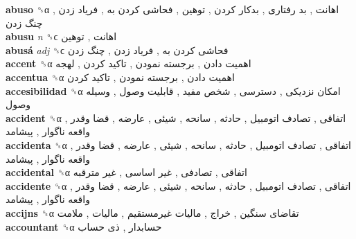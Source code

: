 \textbf{abuso} ␝α   اهانت ,  بد رفتاری ,  بدکار کردن ,  توهین ,  فحاشی کردن به ,  فریاد زدن ,  چنگ زدن   \\
\textbf{abusu} \emph{n}  ␝ϲ   اهانت ,  توهین   \\
\textbf{abusá} \emph{adj}  ␝ϲ   فحاشی کردن به ,  فریاد زدن ,  چنگ زدن   \\
\textbf{accent} ␝α   اهمیت دادن ,  برجسته نمودن ,  تاکید کردن ,  لهجه   \\
\textbf{accentua} ␝α   اهمیت دادن ,  برجسته نمودن ,  تاکید کردن   \\
\textbf{accesibilidad} ␝α   امکان نزدیکی ,  دسترسی ,  شخص مفید ,  قابلیت وصول ,  وسیله وصول   \\
\textbf{accident} ␝α   اتفاقی ,  تصادف اتومبیل ,  حادثه ,  سانحه ,  شیئی ,  عارضه ,  قضا وقدر ,  واقعه ناگوار ,  پیشامد   \\
\textbf{accidenta} ␝α   اتفاقی ,  تصادف اتومبیل ,  حادثه ,  سانحه ,  شیئی ,  عارضه ,  قضا وقدر ,  واقعه ناگوار ,  پیشامد   \\
\textbf{accidental} ␝α   اتفاقی ,  تصادفی ,  غیر اساسی ,  غیر مترقبه   \\
\textbf{accidente} ␝α   اتفاقی ,  تصادف اتومبیل ,  حادثه ,  سانحه ,  شیئی ,  عارضه ,  قضا وقدر ,  واقعه ناگوار ,  پیشامد   \\
\textbf{accijns} ␝α   تقاضای سنگین ,  خراج ,  مالیات غیرمستقیم ,  مالیات ,  ملامت   \\
\textbf{accountant} ␝α   حسابدار ,  ذی حساب   \\
